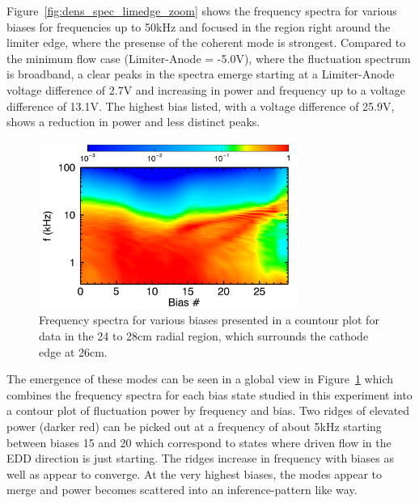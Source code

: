 \documentclass[aip,pop,amsmath,amssymb,reprint,superscriptaddress]{revtex4-1} %
\begin{document}
Figure~\ref{fig:dens_spec_limedge_zoom} shows the frequency spectra for various biases for frequencies up to 50kHz and focused in the region right around the limiter edge, where the presense of the coherent mode is strongest. Compared to the minimum flow case (Limiter-Anode = -5.0V), where the fluctuation spectrum is broadband, a clear peaks in the spectra emerge starting at a Limiter-Anode voltage difference of 2.7V and increasing in power and frequency up to a voltage difference of 13.1V. The highest bias listed, with a voltage difference of 25.9V, shows a reduction in power and less distinct peaks.

\begin{figure}[!htbp]
\centerline{
\includegraphics[width=8.5cm]{Dens_Flucs_Cont_24to28cm.png}}%
\caption{\label{fig:Dens_Flucs_Contour} Frequency spectra for various biases presented in a countour plot for data in the 24 to 28cm radial region, which surrounds the cathode edge at 26cm.}
\end{figure}

The emergence of these modes can be seen in a global view in Figure~\ref{fig:Dens_Flucs_Contour} which combines the frequency spectra for each bias state studied in this experiment into a contour plot of fluctuation power by frequency and bias. Two ridges of elevated power (darker red) can be picked out at a frequency of about 5kHz starting between biases 15 and 20 which correspond to states where driven flow in the EDD direction is just starting. The ridges increase in frequency with biases as well as appear to converge. At the very highest biases, the modes appear to merge and power becomes scattered into an inference-pattern like way.
\end{document}
